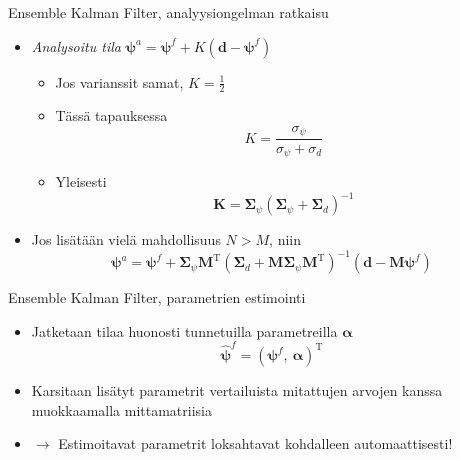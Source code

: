 \documentclass{beamer}
\begin{document}
\begin{frame}{Ensemble Kalman Filter, analyysiongelman ratkaisu}

\begin{itemize}
\item \emph{Analysoitu tila} $\boldsymbol{\psi}^a = \boldsymbol{\psi}^f + K\left(\boldsymbol{d}-\boldsymbol{\psi}^f\right)$
\begin{itemize}
\item Jos varianssit samat, $K = \frac{1}{2}$
\item Tässä tapauksessa \[ K = \frac{\sigma_\psi}{\sigma_\psi+\sigma_d} \]
\item Yleisesti \[ \mathbf{K} = \boldsymbol{\Sigma}_\psi\left(\boldsymbol{\Sigma}_\psi+\boldsymbol{\Sigma}_d\right)^{-1} \]
\end{itemize}
\item Jos lisätään vielä mahdollisuus $N > M$, niin 
\[
\boldsymbol{\psi}^a = \boldsymbol{\psi}^f + \boldsymbol{\Sigma}_\psi \mathbf{M}^\mathrm{T} \left(\boldsymbol{\Sigma}_d+\mathbf{M}\boldsymbol{\Sigma}_\psi\mathbf{M}^\mathrm{T}\right)^{-1}\left(\boldsymbol{d}-\mathbf{M}\boldsymbol{\psi}^f\right)
\]
\end{itemize}

\end{frame}

\begin{frame}{Ensemble Kalman Filter, parametrien estimointi}

\begin{itemize}
\item Jatketaan tilaa huonosti tunnetuilla parametreilla $\boldsymbol{\alpha}$
\[ \boldsymbol{\hat{\psi}}^f = \left(\boldsymbol{\psi}^f,~\boldsymbol{\alpha}\right)^\mathrm{T} \]
\item Karsitaan lisätyt parametrit vertailuista mitattujen arvojen kanssa muokkaamalla mittamatriisia
\item $\rightarrow$ Estimoitavat parametrit loksahtavat kohdalleen automaattisesti!
\end{itemize}

\end{frame}
\end{document}
